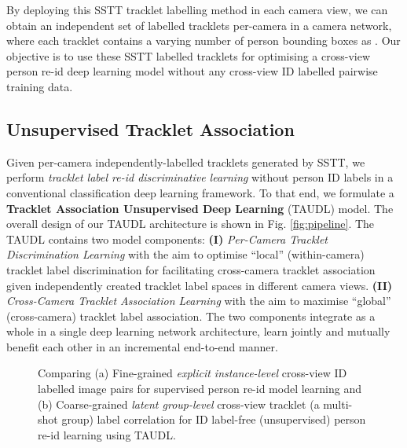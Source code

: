 \documentclass[runningheads]{llncs}
\begin{document}
By deploying this SSTT tracklet labelling method in each camera view, 
we can obtain an independent set of labelled tracklets 
per-camera in a camera network,
where each tracklet contains a varying number of 
person bounding boxes as . 
Our objective is to use these SSTT labelled tracklets
for optimising a cross-view person re-id deep learning model
without any cross-view ID labelled pairwise training data.



\subsection{Unsupervised Tracklet Association}
\label{sec:tracklet_asso_learning}

Given per-camera independently-labelled tracklets  
 generated by SSTT, 
we perform {\em tracklet label re-id discriminative learning}
without person ID labels in a 
conventional classification deep learning framework.
To that end, we formulate a {\bf Tracklet Association Unsupervised Deep Learning} (TAUDL) model.
The overall design of our TAUDL architecture is shown
in Fig. \ref{fig:pipeline}.
The TAUDL contains two model components:
{\bf(I)} {\em Per-Camera Tracklet Discrimination Learning} 
with the aim to optimise ``local'' (within-camera) tracklet label discrimination
for facilitating cross-camera tracklet association
given independently created tracklet label spaces in different camera views.
{\bf(II)} {\em Cross-Camera Tracklet Association Learning}
with the aim to maximise ``global'' (cross-camera) tracklet label association.
The two components integrate as a whole in a single deep learning 
network architecture, learn jointly and mutually benefit each other
in an incremental end-to-end manner.

\begin{figure} [h]
	\centering
	\caption{Comparing
		(a) Fine-grained {\em explicit instance-level}
          cross-view ID labelled image pairs for supervised person
          re-id model learning and 
		(b) Coarse-grained {\em latent group-level} cross-view
                tracklet (a multi-shot group) label correlation for ID label-free
                (unsupervised) person re-id learning using TAUDL. 
	}
	\label{fig:label_info}
\end{figure}
\end{document}
